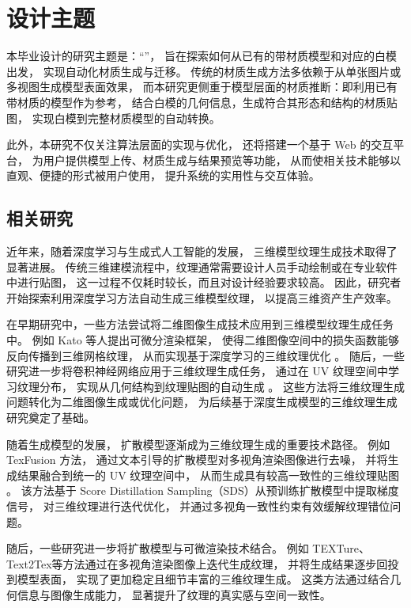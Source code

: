 \section{设计主题}
本毕业设计的研究主题是：“\Title”，
旨在探索如何从已有的带材质模型和对应的白模出发，
实现自动化材质生成与迁移。
传统的材质生成方法多依赖于从单张图片或多视图生成模型表面效果，
而本研究更侧重于模型层面的材质推断：即利用已有带材质的模型作为参考，
结合白模的几何信息，生成符合其形态和结构的材质贴图，
实现白模到完整材质模型的自动转换。

此外，本研究不仅关注算法层面的实现与优化，
还将搭建一个基于 Web 的交互平台，
为用户提供模型上传、材质生成与结果预览等功能，
从而使相关技术能够以直观、便捷的形式被用户使用，
提升系统的实用性与交互体验。

\subsection{相关研究}
近年来，随着深度学习与生成式人工智能的发展，
三维模型纹理生成技术取得了显著进展。
传统三维建模流程中，纹理通常需要设计人员手动绘制或在专业软件中进行贴图，
这一过程不仅耗时较长，而且对设计经验要求较高。
因此，研究者开始探索利用深度学习方法自动生成三维模型纹理，
以提高三维资产生产效率。

在早期研究中，一些方法尝试将二维图像生成技术应用到三维模型纹理生成任务中。
例如 Kato 等人提出可微分渲染框架，
使得二维图像空间中的损失函数能够反向传播到三维网格纹理，
从而实现基于深度学习的三维纹理优化 \cite{kato2018neural}。
随后，一些研究进一步将卷积神经网络应用于三维纹理生成任务，
通过在 UV 纹理空间中学习纹理分布，
实现从几何结构到纹理贴图的自动生成 \cite{pavllo2020convolutional}。
这些方法将三维纹理生成问题转化为二维图像生成或优化问题，
为后续基于深度生成模型的三维纹理生成研究奠定了基础。

随着生成模型的发展，
扩散模型逐渐成为三维纹理生成的重要技术路径。\cite{ho2020denoising}
例如 TexFusion 方法，
通过文本引导的扩散模型对多视角渲染图像进行去噪，
并将生成结果融合到统一的 UV 纹理空间中，
从而生成具有较高一致性的三维纹理贴图 \cite{Cao_2023_ICCV}。
该方法基于 Score Distillation Sampling（SDS）从预训练扩散模型中提取梯度信号，
对三维纹理进行迭代优化，
并通过多视角一致性约束有效缓解纹理错位问题。

随后，一些研究进一步将扩散模型与可微渲染技术结合。
例如 TEXTure\cite{richardson2023texture}、 Text2Tex\cite{chen2023text2tex}等方法通过在多视角渲染图像上迭代生成纹理，
并将生成结果逐步回投到模型表面，
实现了更加稳定且细节丰富的三维纹理生成。
这类方法通过结合几何信息与图像生成能力，
显著提升了纹理的真实感与空间一致性。

